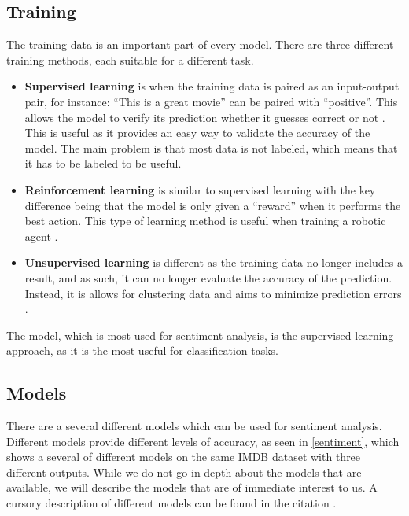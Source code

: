 \subsection{Training}
The training data is an important part of every model. There are three
different training methods, each suitable for a different task.

\begin{itemize}
  \item \textbf{Supervised learning} is when the training data is paired as an
  input-output pair, for instance: ``This is a great movie'' can be paired with
  ``positive''. This allows the model to verify its prediction whether it
  guesses correct or not \citep[Ch. 7.0]{MIBook}. This is useful as it provides
  an easy way to validate the accuracy of the model. The main problem is that
  most data is not labeled, which means that it has to be labeled to be useful.
  \item \textbf{Reinforcement learning} is similar to supervised learning with
  the key difference being that the model is only given a ``reward'' when it
  performs the best action. This type of learning method is useful when
  training a robotic agent \citep{Reinforcement}.
  \item \textbf{Unsupervised learning} is different as the training data no
  longer includes a result, and as such, it can no longer evaluate the accuracy
  of the prediction. Instead, it is allows for clustering data and aims to
  minimize prediction errors \citep[Ch. 11.1]{MIBook}.
\end{itemize}

The model, which is most used for sentiment analysis, is the supervised learning
approach, as it is the most useful for classification tasks.

\subsection{Models}\label{subsub:Models}

There are a several different models which can be used for sentiment analysis. 
Different models provide different levels of accuracy, as seen in
\autoref{sentiment}, which shows a several of different models on the same IMDB
dataset with three different outputs. While we do not go in depth about the
models that are available, we will describe the models that are of
immediate interest to us. A cursory description of different models can be
found in the citation \citep{Classification}.

